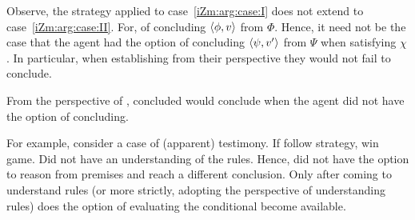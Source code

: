 \begin{note}
  Observe, the strategy applied to case~\ref{iZm:arg:case:I} does not extend to case~\ref{iZm:arg:case:II}.
  For, \requ{} of concluding \(\langle \phi, v \rangle\) from \(\Phi\).
  Hence, it need not be the case that the agent had the option of concluding \(\langle \psi, v' \rangle\) from \(\Psi\) when satisfying \(\chi\).
  In particular, when establishing from their perspective they would not fail to conclude.

  From the perspective of \iZSm{}, concluded would conclude when the agent did not have the option of concluding.

  For example, consider a case of (apparent) testimony.
  If follow strategy, win game.
  Did not have an understanding of the rules.
  Hence, did not have the option to reason from premises and reach a different conclusion.
  Only after coming to understand rules (or more strictly, adopting the perspective of understanding rules) does the option of evaluating the conditional become available.
\end{note}

